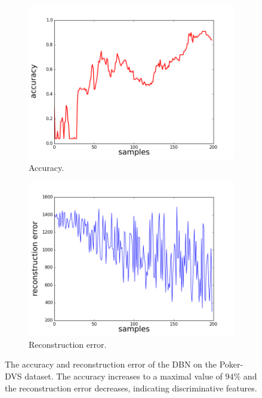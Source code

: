 \begin{figure}[h!]
	\centering
	\begin{subfigure}[t]{.45\textwidth}
  		\centering
  		\includegraphics[width=.9\linewidth]{imgs/poker/acc.png}
  		\caption{Accuracy.}
  		\label{fig:sub1}
	\end{subfigure}%
	\begin{subfigure}[t]{.45\textwidth}
  		\centering
  		\includegraphics[width=.9\linewidth]{imgs/poker/recon_err.png}
  		\caption{Reconstruction error.}
  		\label{fig:sub2}
	\end{subfigure}
	\caption[The accuracy and reconstruction error of the DBN on the Poker-DVS dataset.]{The accuracy and reconstruction error of the DBN on the Poker-DVS dataset. The accuracy increases to a maximal value of $94 \%$ and the reconstruction error decreases, indicating discriminative features. }
	\label{fig:poker_err}
\end{figure}


